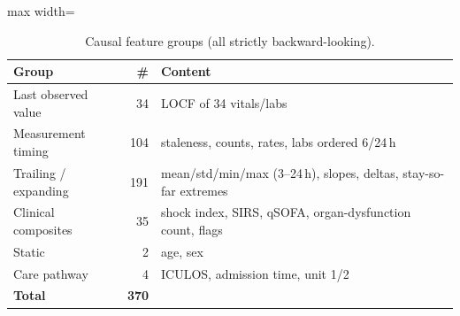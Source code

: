 \begin{table}[!t]
\centering\footnotesize
\caption{Causal feature groups (all strictly backward-looking).}
\label{tab:features}
\begin{adjustbox}{max width=\linewidth}
\begin{tabular}{lrp{4.4cm}}
\toprule
Group & \# & Content \\
\midrule
Last observed value & 34 & LOCF of 34 vitals/labs \\
Measurement timing & 104 & staleness, counts, rates, labs ordered 6/24\,h \\
Trailing / expanding & 191 & mean/std/min/max (3--24\,h), slopes, deltas, stay-so-far extremes \\
Clinical composites & 35 & shock index, SIRS, qSOFA, organ-dysfunction count, flags \\
Static & 2 & age, sex \\
Care pathway & 4 & ICULOS, admission time, unit 1/2 \\
\midrule
\textbf{Total} & \textbf{370} &  \\
\bottomrule
\end{tabular}
\end{adjustbox}
\end{table}
